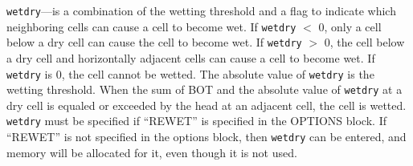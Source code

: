 \begin{description}
\item \texttt{wetdry}---is a combination of the wetting threshold and a flag to indicate which neighboring cells can cause a cell to become wet. If \texttt{wetdry} $<$ 0, only a cell below a dry cell can cause the cell to become wet. If \texttt{wetdry} $>$ 0, the cell below a dry cell and horizontally adjacent cells can cause a cell to become wet. If \texttt{wetdry} is 0, the cell cannot be wetted. The absolute value of \texttt{wetdry} is the wetting threshold. When the sum of BOT and the absolute value of \texttt{wetdry} at a dry cell is equaled or exceeded by the head at an adjacent cell, the cell is wetted.  \texttt{wetdry} must be specified if ``REWET'' is specified in the OPTIONS block.  If ``REWET'' is not specified in the options block, then \texttt{wetdry} can be entered, and memory will be allocated for it, even though it is not used.

\end{description}

